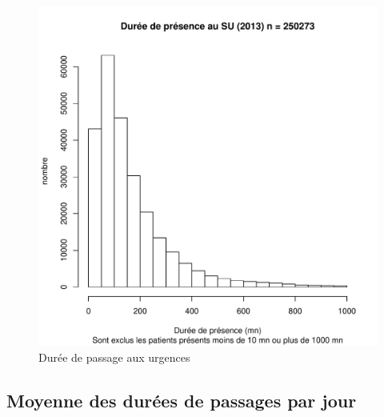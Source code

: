 \documentclass[12pt,english,french,twoside]{report}\usepackage[]{graphicx}\usepackage[]{color}
\makeatletter
\def\maxwidth{ %
  \ifdim\Gin@nat@width>\linewidth
    \linewidth
  \else
    \Gin@nat@width
  \fi
}
\newenvironment{knitrout}{}{} %
\makeatother
\begin{document}
\begin{figure}[ht!]
 \centering
\begin{knitrout}
\color{fgcolor}
\includegraphics[width=\maxwidth]{figure/passages_clean_hist} 

\end{knitrout}

 \caption{Durée de passage aux urgences}
\end{figure}

\subsection{Moyenne des durées de passages par jour}
\end{document}

